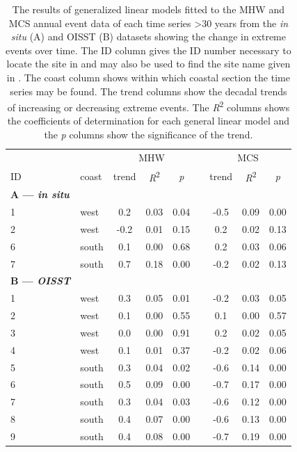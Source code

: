 \documentclass[a4paper,10pt,review]{elsarticle}
\begin{document}
\begin{table}[]
\centering
\caption{\small The results of generalized linear models fitted to the MHW and MCS annual event data of each time series >30 years from the \emph{in situ} (A) and OISST (B) datasets showing the change in extreme events over time. The ID column gives the ID number necessary to locate the site in  and may also be used to find the site name given in . The coast column shows within which coastal section the time series may be found. The trend columns show the decadal trends of increasing or decreasing extreme events. The \emph{R}\textsuperscript{2} columns shows the coefficients of determination for each general linear model and the \emph{p} columns show the significance of the trend.}
\label{table4}
\begin{tiny}
\begin{tabular}{llccccccc}
\toprule
&& \multicolumn{3}{c}{MHW} & \phantom{abc} & \multicolumn{3}{c}{MCS} \\
\cmidrule{3-5} \cmidrule{7-9}
ID & coast & trend & \emph{R}\textsuperscript{2} & \emph{p} && trend & \emph{R}\textsuperscript{2} & \emph{p} \\
\midrule
{\bf{A} --- \emph{in situ}} \\
1 & west & 0.2 & 0.03 & 0.04 && -0.5 & 0.09 & 0.00 \\
  2 & west & -0.2 & 0.01 & 0.15 && 0.2 & 0.02 & 0.13 \\
  6 & south & 0.1 & 0.00 & 0.68 && 0.2 & 0.03 & 0.06 \\
  7 & south & 0.7 & 0.18 & 0.00 && -0.2 & 0.02 & 0.13 \\
{\bf{B} --- \emph{OISST}} \\
  1 & west & 0.3 & 0.05 & 0.01 && -0.2 & 0.03 & 0.05 \\
  2 & west & 0.1 & 0.00 & 0.55 && 0.1 & 0.00 & 0.57 \\
  3 & west & 0.0 & 0.00 & 0.91 && 0.2 & 0.02 & 0.05 \\
  4 & west & 0.1 & 0.01 & 0.37 && -0.2 & 0.02 & 0.06 \\
  5 & south & 0.3 & 0.04 & 0.02 && -0.6 & 0.14 & 0.00 \\
  6 & south & 0.5 & 0.09 & 0.00 && -0.7 & 0.17 & 0.00 \\
  7 & south & 0.3 & 0.04 & 0.03 && -0.6 & 0.12 & 0.00 \\
  8 & south & 0.4 & 0.07 & 0.00 && -0.6 & 0.13 & 0.00 \\
  9 & south & 0.4 & 0.08 & 0.00 && -0.7 & 0.19 & 0.00 \\

\end{tabular}
\end{tiny}
\end{table}
\end{document}
